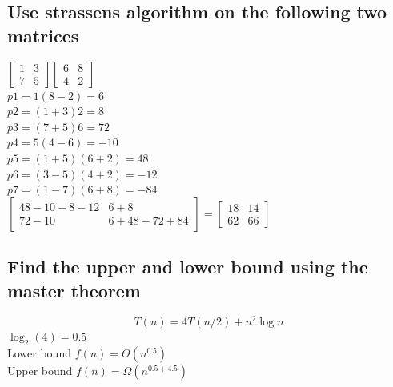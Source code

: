 \documentclass[12pt, a4paper]{article}
\begin{document}
			\subsection{Use strassens algorithm on the following two matrices}
				$\begin{bmatrix}1&3\\ 7&5\end{bmatrix}\begin{bmatrix}6&8\\ 4&2\end{bmatrix}$\\
				$p1=1(8-2)=6$\\
				$p2=(1+3)2=8$\\
				$p3=(7+5)6=72$\\
				$p4=5(4-6)=-10$\\
				$p5=(1+5)(6+2)=48$\\
				$p6=(3-5)(4+2)=-12$\\
				$p7=(1-7)(6+8)=-84$\\
				$\begin{bmatrix}48-10-8-12&6+8\\ 72-10&6+48-72+84\end{bmatrix}=\begin{bmatrix}18&14\\ 62&66\end{bmatrix}$
			\subsection{Find the upper and lower bound using the master theorem}
				$$T(n)=4T(n/2)+n^2\log n$$
				$\log_2(4)=0.5$ \\
				Lower bound $f(n)=\Theta(n^{0.5})$\\
				Upper bound $f(n)=\Omega( n^{0.5+4.5})$
					
				
\end{document}
